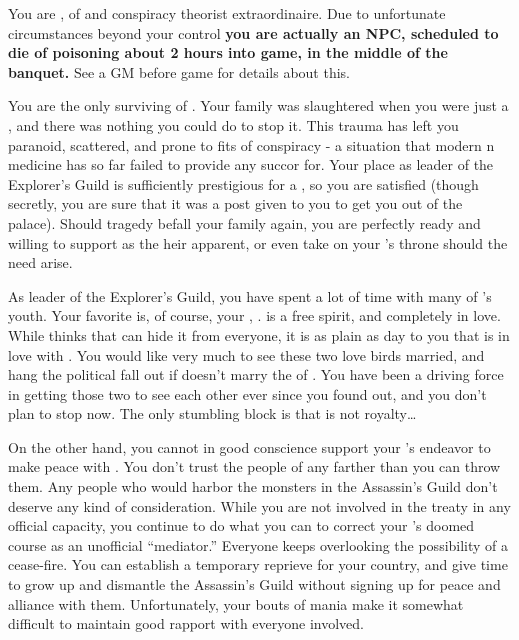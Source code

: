 \documentclass[char]{NeptuneBall}
\begin{document}
\name{\cPlant{}}

You are \cPlant{}, \cPlant{\prince} of \pAtlantis{} and conspiracy theorist extraordinaire. Due to unfortunate circumstances beyond your control {\bf you are actually an NPC, scheduled to die of poisoning about 2 hours into game, in the middle of the banquet. }  See a GM before game for details about this.

You are the only surviving \cPlant{\sibling} of \cKing{}. Your family was slaughtered when you were just a \cPlant{\kid}, and there was nothing you could do to stop it. This trauma has left you paranoid, scattered, and prone to fits of conspiracy - a situation that modern \pAtlantis{}n medicine has so far failed to provide any succor for. Your place as leader of the Explorer's Guild is sufficiently prestigious for a \cPlant{\prince}, so you are satisfied (though secretly, you are sure that it was a post given to you to get you out of the palace). Should tragedy befall your family again, you are perfectly ready and willing to support \cPrincess{\prince} \cPrincess{} as the heir apparent, or even take on your \cKing{\sibling}'s throne should the need arise.

As leader of the Explorer's Guild, you have spent a lot of time with many of \pAtlantis{}'s youth. Your favorite is, of course, your \cPrincess{\nephew}, \cPrincess{\prince} \cPrincess{}. \cPrincess{\They} is a free spirit, and completely in love. While \cPrincess{\they} thinks that \cPrincess{\they} can hide it from everyone, it is as plain as day to you that \cPrincess{} is in love with \cDiplomat{}. You would like very much to see these two love birds married, and hang the political fall out if \cPrincess{} doesn't marry the \cPrince{\prince} of \pPacifica{}. You have been a driving force in getting those two to see each other ever since you found out, and you don't plan to stop now. The only stumbling block is that \cDiplomat{} is not royalty\ldots

On the other hand, you cannot in good conscience support your \cKing{\sibling}'s endeavor to make peace with \pPacifica{}. You don't trust the people of \pPacifica{} any farther than you can throw them. Any people who would harbor the monsters in the Assassin's Guild don't deserve any kind of consideration. While you are not involved in the treaty in any official capacity, you continue to do what you can to correct your \cKing{\sibling}'s doomed course as an unofficial ``mediator.'' Everyone keeps overlooking the possibility of a cease-fire. You can establish a temporary reprieve for your country, and give \pPacifica{} time to grow up and dismantle the Assassin's Guild without signing up for peace and alliance with them. Unfortunately, your bouts of mania make it somewhat difficult to maintain good rapport with everyone involved.
\end{document}
